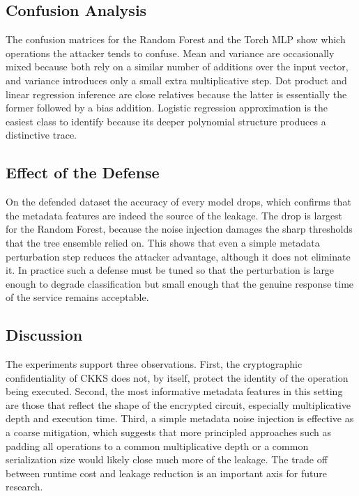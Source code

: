\documentclass[12pt,a4paper]{article}
\begin{document}

\subsection{Confusion Analysis}
The confusion matrices for the Random Forest and the Torch MLP show which operations the attacker tends to confuse. Mean and variance are occasionally mixed because both rely on a similar number of additions over the input vector, and variance introduces only a small extra multiplicative step. Dot product and linear regression inference are close relatives because the latter is essentially the former followed by a bias addition. Logistic regression approximation is the easiest class to identify because its deeper polynomial structure produces a distinctive trace.


\subsection{Effect of the Defense}
On the defended dataset the accuracy of every model drops, which confirms that the metadata features are indeed the source of the leakage. The drop is largest for the Random Forest, because the noise injection damages the sharp thresholds that the tree ensemble relied on. This shows that even a simple metadata perturbation step reduces the attacker advantage, although it does not eliminate it. In practice such a defense must be tuned so that the perturbation is large enough to degrade classification but small enough that the genuine response time of the service remains acceptable.

\subsection{Discussion}
The experiments support three observations. First, the cryptographic confidentiality of CKKS does not, by itself, protect the identity of the operation being executed. Second, the most informative metadata features in this setting are those that reflect the shape of the encrypted circuit, especially multiplicative depth and execution time. Third, a simple metadata noise injection is effective as a coarse mitigation, which suggests that more principled approaches such as padding all operations to a common multiplicative depth or a common serialization size would likely close much more of the leakage. The trade off between runtime cost and leakage reduction is an important axis for future research.
\end{document}
